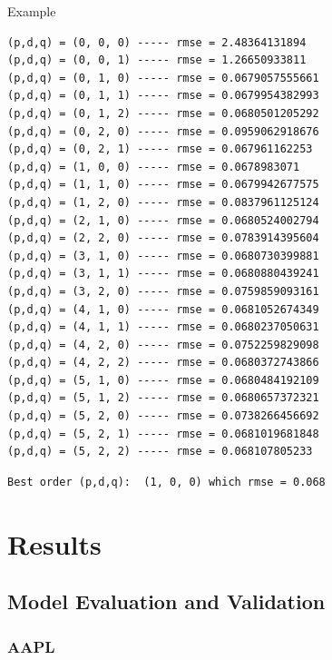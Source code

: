 \documentclass[11pt]{article}
\begin{document}
\begin{itemize}
  Example

\begin{verbatim}
(p,d,q) = (0, 0, 0) ----- rmse = 2.48364131894
(p,d,q) = (0, 0, 1) ----- rmse = 1.26650933811
(p,d,q) = (0, 1, 0) ----- rmse = 0.0679057555661
(p,d,q) = (0, 1, 1) ----- rmse = 0.0679954382993
(p,d,q) = (0, 1, 2) ----- rmse = 0.0680501205292
(p,d,q) = (0, 2, 0) ----- rmse = 0.0959062918676
(p,d,q) = (0, 2, 1) ----- rmse = 0.067961162253
(p,d,q) = (1, 0, 0) ----- rmse = 0.0678983071
(p,d,q) = (1, 1, 0) ----- rmse = 0.0679942677575
(p,d,q) = (1, 2, 0) ----- rmse = 0.0837961125124
(p,d,q) = (2, 1, 0) ----- rmse = 0.0680524002794
(p,d,q) = (2, 2, 0) ----- rmse = 0.0783914395604
(p,d,q) = (3, 1, 0) ----- rmse = 0.0680730399881
(p,d,q) = (3, 1, 1) ----- rmse = 0.0680880439241
(p,d,q) = (3, 2, 0) ----- rmse = 0.0759859093161
(p,d,q) = (4, 1, 0) ----- rmse = 0.0681052674349
(p,d,q) = (4, 1, 1) ----- rmse = 0.0680237050631
(p,d,q) = (4, 2, 0) ----- rmse = 0.0752259829098
(p,d,q) = (4, 2, 2) ----- rmse = 0.0680372743866
(p,d,q) = (5, 1, 0) ----- rmse = 0.0680484192109
(p,d,q) = (5, 1, 2) ----- rmse = 0.0680657372321
(p,d,q) = (5, 2, 0) ----- rmse = 0.0738266456692
(p,d,q) = (5, 2, 1) ----- rmse = 0.0681019681848
(p,d,q) = (5, 2, 2) ----- rmse = 0.068107805233
\end{verbatim}

\begin{verbatim}
Best order (p,d,q):  (1, 0, 0) which rmse = 0.068
\end{verbatim}
\end{itemize}

\section{Results}\label{results}

\subsection{Model Evaluation and
Validation}\label{model-evaluation-and-validation}

\subsubsection{AAPL}\label{aapl}
\end{document}
